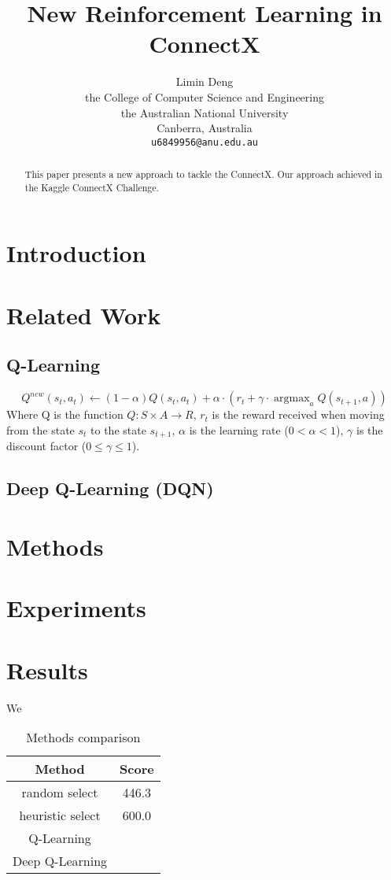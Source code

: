 \documentclass{article}
\title{New Reinforcement Learning in ConnectX}
\author{%
Limin Deng \\
the College of Computer Science and Engineering\\
 the Australian National University\\
  Canberra, Australia\\
  \texttt{u6849956@anu.edu.au} \\
}
\begin{document}
\maketitle

\begin{abstract}
This paper presents a new approach to tackle the ConnectX. Our approach achieved in the Kaggle ConnectX Challenge.
\end{abstract}

\section{Introduction}


\section{Related Work}
\subsection{Q-Learning}
\begin{equation}
Q^{new}(s_t, a_t)  \leftarrow (1-\alpha)Q(s_t, a_t) + \alpha \cdot \left(r_t + \gamma \cdot \mathop{\arg\max}_{a}  Q(s_{t+1}, a) \right)
\end{equation}
Where Q is the function $Q: S \times A \rightarrow R$, $r_t$ is the reward received when moving from the state $s_t$ to the state $s_{t+1}$, $\alpha$ is the learning rate ($ 0 < \alpha < 1$), $\gamma$ is the discount factor ($0 \leq \gamma \leq 1$).
\subsection{Deep Q-Learning (DQN)}

\section{Methods}

\section{Experiments}


\section{Results}

We 
\begin{table}[!htp]
\centering
\begin{tabular}{c|c}
\toprule
Method & Score \\
\toprule
random select & 446.3 \\
\hline
heuristic select & 600.0 \\
\hline
Q-Learning & \\
\hline
Deep Q-Learning & \\
\bottomrule
\end{tabular}
\caption{Methods comparison}
\label{tab:methods}
\end{table}





\end{document}
